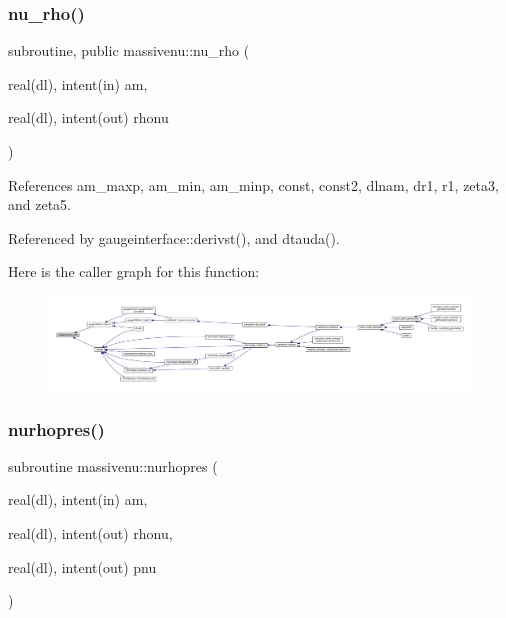 \subsubsection{\texorpdfstring{nu\+\_\+rho()}{nu\_rho()}}
{\footnotesize\ttfamily subroutine, public massivenu\+::nu\+\_\+rho (\begin{DoxyParamCaption}\item[{real(dl), intent(in)}]{am,  }\item[{real(dl), intent(out)}]{rhonu }\end{DoxyParamCaption})}



References am\+\_\+maxp, am\+\_\+min, am\+\_\+minp, const, const2, dlnam, dr1, r1, zeta3, and zeta5.



Referenced by gaugeinterface\+::derivst(), and dtauda().

Here is the caller graph for this function\+:
\nopagebreak
\begin{figure}[H]
\begin{center}
\leavevmode
\includegraphics[width=350pt]{namespacemassivenu_a5e5e907b67a43f82b29065f75a696ae5_icgraph}
\end{center}
\end{figure}
\mbox{\label{namespacemassivenu_ae38eedf1b14513e212f542f0afcb8a7f}} 
\subsubsection{\texorpdfstring{nurhopres()}{nurhopres()}}
{\footnotesize\ttfamily subroutine massivenu\+::nurhopres (\begin{DoxyParamCaption}\item[{real(dl), intent(in)}]{am,  }\item[{real(dl), intent(out)}]{rhonu,  }\item[{real(dl), intent(out)}]{pnu }\end{DoxyParamCaption})\hspace{0.3cm}{\ttfamily [private]}}



